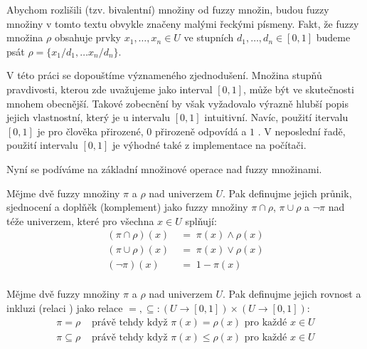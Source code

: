 \begin{notation*}
 Abychom rozlišili  (tzv. bivalentní) množiny od fuzzy množin, budou fuzzy množiny v tomto textu obvykle značeny malými řeckými písmeny. Fakt, že fuzzy množina $\rho$ obsahuje prvky $x_1, \dots, x_n \in U$ ve stupních $d_1, \dots, d_n \in [0,1]$ budeme psát $\rho = \{ x_1 / d_1, \dots x_n / d_n \}$. 
\end{notation*}

V této práci se dopouštíme význameného zjednodušení. Množina stupňů pravdivosti, kterou zde uvažujeme jako interval $[0, 1]$, může být ve skutečnosti mnohem obecnější. Takové zobecnění by však vyžadovalo výrazně hlubší popis jejich vlastnostní, který je u intervalu $[0, 1]$ intuitivní. Navíc, použití itervalu $[0, 1]$ je pro člověka přirozené, $0$ přirozeně odpovídá  a $1$ . V neposlední řadě, použití intervalu $[0, 1]$ je výhodné také z implementace na počítači.


Nyní se podíváme na základní množinové operace nad fuzzy množinami.

\begin{definition}
 Mějme dvě fuzzy množiny $\pi$ a $\rho$ nad univerzem $U$. Pak definujme jejich průnik, sjednocení a doplňěk (komplement) jako fuzzy množiny $\pi \cap \rho$, $\pi \cup \rho$ a $\neg \pi$ nad téže univerzem, které pro všechna $x \in U$ splňují:
 \begin{align*}
  (\pi \cap \rho)(x) 	\; &= \; \pi(x) \wedge \rho(x) \\
  (\pi \cup \rho)(x) 	\; &= \; \pi(x) \vee \rho(x) \\
  (\neg \pi)(x) 	\; &= \; 1 - \pi(x) \\
 \end{align*}
\end{definition}

\begin{definition}
 Mějme dvě fuzzy množiny $\pi$ a $\rho$ nad univerzem $U$. Pak definujme jejich rovnost a inkluzi (relaci ) jako relace $=,\subseteq: (U \rightarrow [0,1]) \times (U \rightarrow [0,1])$:
 \begin{align*}
  \pi = \rho 		&\text{ právě tehdy když } \pi(x) = \rho(x) 	\text{ pro každé $x \in U$}	\\
  \pi \subseteq \rho 	&\text{ právě tehdy když } \pi(x) \leq \rho(x) 	\text{ pro každé $x \in U$}	\\	
 \end{align*}
\end{definition}

